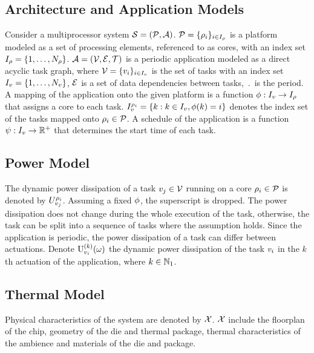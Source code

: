 \subsection{Architecture and Application Models}
Consider a multiprocessor system $\mathcal{S} = (\mathcal{P}, \mathcal{A})$. $\mathcal{P} = \{ \rho_i \}_{i \in I_\rho}$ is a platform modeled as a set of processing elements, referenced to as cores, with an index set $I_\rho = \{ 1, \dots, N_\rho \}$. $\mathcal{A} = (\mathcal{V}, \mathcal{E}, \mathcal{T})$ is a periodic application modeled as a direct acyclic task graph, where $\mathcal{V} = \{v_i\}_{i \in I_v}$ is the set of tasks with an index set $I_v = \{ 1, \dots, N_v \}$, $\mathcal{E}$ is a set of data dependencies between tasks, $\period$ is the period. A mapping of the application onto the given platform is a function $\phi: I_v \to I_\rho$ that assigns a core to each task. $I_v^{\rho_i} = \{ k: k \in I_v, \phi(k) = i \}$ denotes the index set of the tasks mapped onto $\rho_i \in \mathcal{P}$. A schedule of the application is a function $\psi: I_v \to \mathbb{R}^{+}$ that determines the start time of each task.

\subsection{Power Model}
The dynamic power dissipation of a task $v_j \in \mathcal{V}$ running on a core $\rho_i \in \mathcal{P}$ is denoted by $U^{\rho_i}_{v_j}$. Assuming a fixed $\phi$, the superscript is dropped. The power dissipation does not change during the whole execution of the task, otherwise, the task can be split into a sequence of tasks where the assumption holds. Since the application is periodic, the power dissipation of a task can differ between actuations. Denote $\textrm{U}^{(k)}_{v_i}(\omega)$ the dynamic power dissipation of the task $v_i$ in the $k$th actuation of the application, where $k \in \mathbb{N}_{1}$.

\subsection{Thermal Model}
Physical characteristics of the system are denoted by $\mathcal{X}$. $\mathcal{X}$ include the floorplan of the chip, geometry of the die and thermal package, thermal characteristics of the ambience and materials of the die and package.


